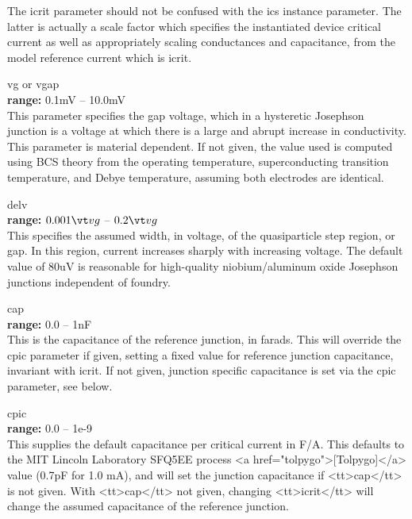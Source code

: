 \begin{description}
The {\vt icrit} parameter should not be confused with the
{\vt ics} instance parameter.  The latter is actually a scale
factor which specifies the instantiated device critical current as
well as appropriately scaling conductances and capacitance, from
the model reference current which is {\vt icrit}.

\item{{\vt vg} or {\vt vgap}}\\
{\bf range:} 0.1mV -- 10.0mV\\
This parameter specifies the gap voltage, which in a hysteretic
Josephson junction is a voltage at which there is a large and abrupt
increase in conductivity.  This parameter is material dependent.  If
not given, the value used is computed using BCS theory from the
operating temperature, superconducting transition temperature, and
Debye temperature, assuming both electrodes are identical.

\item{\vt delv}\\
{\bf range:} $0.001{\vt vg}$ -- $0.2{\vt vg}$\\
This specifies the assumed width, in voltage, of the quasiparticle
step region, or gap.  In this region, current increases sharply with
increasing voltage.  The default value of 80uV is reasonable for
high-quality niobium/aluminum oxide Josephson junctions independent of
foundry.

\item{\vt cap}\\
{\bf range:} 0.0 -- 1nF\\
This is the capacitance of the reference junction, in farads.  This
will override the {\vt cpic} parameter if given, setting a fixed value
for reference junction capacitance, invariant with {\vt icrit}.  If
not given, junction specific capacitance is set via the {\vt cpic}
parameter, see below.

\item{\vt cpic}\\
{\bf range:} 0.0 -- 1e-9\\
This supplies the default capacitance per critical current in F/A. 
This defaults to the MIT Lincoln Laboratory SFQ5EE process <a
href="tolpygo">[Tolpygo]</a> value (0.7pF for 1.0 mA), and will set
the junction capacitance if <tt>cap</tt> is not given.  With
<tt>cap</tt> not given, changing <tt>icrit</tt> will change the
assumed capacitance of the reference junction.


\end{description}

